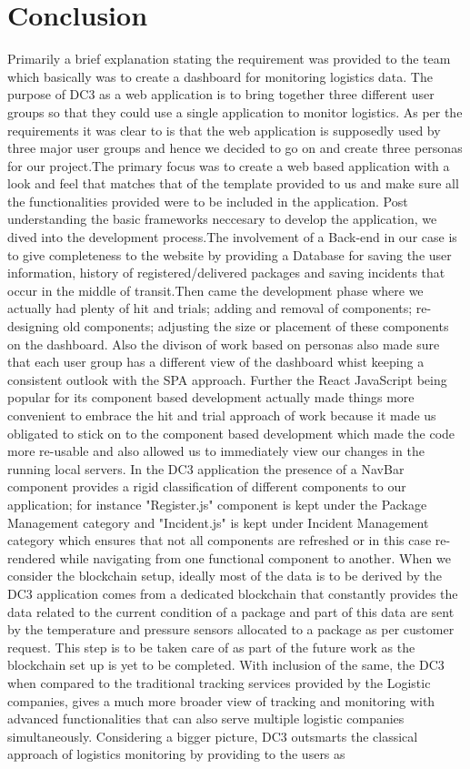 \chapter{Conclusion}
\label{cha:conclusion}

Primarily a brief explanation stating the requirement was provided to the team which basically was to create a dashboard for monitoring logistics data.
The purpose of DC3 as a web application is to bring together three different user groups so that they could use a single application to monitor logistics. As per the requirements it was clear to is that the web application is supposedly used by three major user groups and hence we decided to go on and create three personas for our project.The primary focus was to create a web based application with a look and feel that matches that of the template provided to us and make sure all the functionalities provided were to be included in the application. Post understanding the basic frameworks neccesary to develop the application, we dived into the development process.The involvement of a Back-end in our case is to give completeness to the website by providing a Database for saving the user information, history of registered/delivered packages and saving incidents that occur in the middle of transit.Then came the development phase where we  actually had plenty of hit and trials; adding and removal of components; re-designing old components; adjusting the size or placement of these components on the dashboard. Also the divison of work based on personas also made sure that each user group has a different view of the dashboard whist keeping a consistent outlook with the SPA approach. Further the React JavaScript being popular for its component based development actually made things more convenient to embrace the hit and trial approach of work because it made us obligated to stick on to the component based development which made the code more re-usable and also allowed us to immediately view our changes in the running local servers. In the DC3 application the presence of a NavBar component provides a rigid classification of different components to our application; for instance "Register.js" component is kept under the Package Management category and "Incident.js" is kept under Incident Management category which ensures that not all components are refreshed or in this case re-rendered while navigating from one functional component to another. When we consider the blockchain setup, ideally most of the data is to be derived by the DC3 application comes from a dedicated blockchain that constantly provides the data related to the current condition of a package and part of this data are sent by the temperature and pressure sensors allocated to a package as per customer request. This step is to be taken care of as part of the future work as the blockchain set up is yet to be completed. With inclusion of the same, the DC3 when compared to the traditional tracking services provided by the Logistic companies, gives a much more broader view of tracking and monitoring with advanced functionalities that can also serve multiple logistic companies simultaneously. Considering a bigger picture, DC3 outsmarts the classical approach of logistics monitoring by providing to the users as 